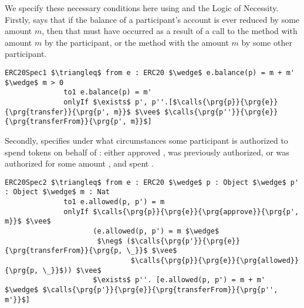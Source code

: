 We specify these necessary conditions here using \Chainmail and the Logic of Necessity. Firstly,  
says that if the balance of a participant's account is ever reduced by some amount $m$, then
that must have occurred as a result of a call to the  method with amount $m$ by the participant,
or the  method with the amount $m$ by some other participant.
\begin{lstlisting}[language = Chainmail, mathescape=true, frame=lines]
ERC20Spec1 $\triangleq$ from e : ERC20 $\wedge$ e.balance(p) = m + m' $\wedge$ m > 0
              to1 e.balance(p) = m'
              onlyIf $\exists$ p', p''.[$\calls{\prg{p}}{\prg{e}}{\prg{transfer}}{\prg{p', m}}$ $\vee$ $\calls{\prg{p''}}{\prg{e}}{\prg{transferFrom}}{\prg{p', m}}$]
\end{lstlisting}
Secondly,  specifies under what circumstances some participant  is authorized to 
spend  tokens on behalf of : either  approved ,  was previously authorized,
or  was authorized for some amount , and spent .
\begin{lstlisting}[language = Chainmail, mathescape=true, frame=lines]
ERC20Spec2 $\triangleq$ from e : ERC20 $\wedge$ p : Object $\wedge$ p' : Object $\wedge$ m : Nat
              to1 e.allowed(p, p') = m
              onlyIf $\calls{\prg{p}}{\prg{e}}{\prg{approve}}{\prg{p', m}}$ $\vee$ 
                     (e.allowed(p, p') = m $\wedge$ 
                      $\neg$ ($\calls{\prg{p'}}{\prg{e}}{\prg{transferFrom}}{\prg{p, \_}}$ $\vee$ 
                              $\calls{\prg{p}}{\prg{e}}{\prg{allowed}}{\prg{p, \_}}$)) $\vee$
                     $\exists$ p''. [e.allowed(p, p') = m + m' $\wedge$ $\calls{\prg{p'}}{\prg{e}}{\prg{transferFrom}}{\prg{p'', m'}}$]
\end{lstlisting}

